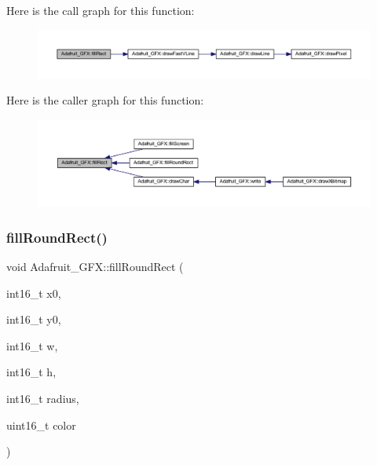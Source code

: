 Here is the call graph for this function\+:
\nopagebreak
\begin{figure}[H]
\begin{center}
\leavevmode
\includegraphics[width=350pt]{d9/d97/class_adafruit___g_f_x_aa43cf1dfe6c17d040a0f1fd5ffbe9d69_cgraph}
\end{center}
\end{figure}
Here is the caller graph for this function\+:
\nopagebreak
\begin{figure}[H]
\begin{center}
\leavevmode
\includegraphics[width=350pt]{d9/d97/class_adafruit___g_f_x_aa43cf1dfe6c17d040a0f1fd5ffbe9d69_icgraph}
\end{center}
\end{figure}
\mbox{\label{class_adafruit___g_f_x_a78dc59f6a508bcd3d5ac7af957b8b1ac}} 
\subsubsection{\texorpdfstring{fill\+Round\+Rect()}{fillRoundRect()}}
{\footnotesize\ttfamily void Adafruit\+\_\+\+G\+F\+X\+::fill\+Round\+Rect (\begin{DoxyParamCaption}\item[{int16\+\_\+t}]{x0,  }\item[{int16\+\_\+t}]{y0,  }\item[{int16\+\_\+t}]{w,  }\item[{int16\+\_\+t}]{h,  }\item[{int16\+\_\+t}]{radius,  }\item[{uint16\+\_\+t}]{color }\end{DoxyParamCaption})}

